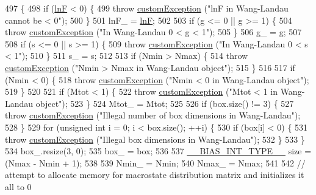 \begin{DoxyCode}
497                                                                                                            
                                     \{
498     \textcolor{keywordflow}{if} (\hyperlink{classwala_acb8e59580d97bc3c5b9b4ff45eb6bb9a}{lnF} < 0) \{
499         \textcolor{keywordflow}{throw} \hyperlink{classcustom_exception}{customException} (\textcolor{stringliteral}{"lnF in Wang-Landau cannot be < 0"});
500     \}
501     lnF\_ = \hyperlink{classwala_acb8e59580d97bc3c5b9b4ff45eb6bb9a}{lnF};
502 
503     \textcolor{keywordflow}{if} (g <= 0 || g >= 1) \{
504         \textcolor{keywordflow}{throw} \hyperlink{classcustom_exception}{customException} (\textcolor{stringliteral}{"In Wang-Landau 0 < g < 1"});
505     \}
506     g\_ = g;
507 
508     \textcolor{keywordflow}{if} (s <= 0 || s >= 1) \{
509         \textcolor{keywordflow}{throw} \hyperlink{classcustom_exception}{customException} (\textcolor{stringliteral}{"In Wang-Landau 0 < s < 1"});
510     \}
511     s\_ = s;
512 
513     \textcolor{keywordflow}{if} (Nmin > Nmax) \{
514         \textcolor{keywordflow}{throw} \hyperlink{classcustom_exception}{customException} (\textcolor{stringliteral}{"Nmin > Nmax in Wang-Landau object"});
515     \}
516 
517     \textcolor{keywordflow}{if} (Nmin < 0) \{
518         \textcolor{keywordflow}{throw} \hyperlink{classcustom_exception}{customException} (\textcolor{stringliteral}{"Nmin < 0 in Wang-Landau object"});
519     \}
520 
521     \textcolor{keywordflow}{if} (Mtot < 1) \{
522         \textcolor{keywordflow}{throw} \hyperlink{classcustom_exception}{customException} (\textcolor{stringliteral}{"Mtot < 1 in Wang-Landau object"});
523     \}
524     Mtot\_ = Mtot;
525 
526     \textcolor{keywordflow}{if} (box.size() != 3) \{
527         \textcolor{keywordflow}{throw} \hyperlink{classcustom_exception}{customException} (\textcolor{stringliteral}{"Illegal number of box dimensions in Wang-Landau"});
528     \}
529     \textcolor{keywordflow}{for} (\textcolor{keywordtype}{unsigned} \textcolor{keywordtype}{int} i = 0; i < box.size(); ++i) \{
530         \textcolor{keywordflow}{if} (box[i] < 0) \{
531             \textcolor{keywordflow}{throw} \hyperlink{classcustom_exception}{customException} (\textcolor{stringliteral}{"Illegal box dimensions in Wang-Landau"});
532         \}
533     \}
534     box\_.resize(3, 0);
535     box\_ = box;
536 
537     \hyperlink{bias_8h_a1ceb524363fcb94da0c64d297ea27438}{\_\_BIAS\_INT\_TYPE\_\_} size = (Nmax - Nmin + 1);
538 
539     Nmin\_ = Nmin;
540     Nmax\_ = Nmax;
541 
542     \textcolor{comment}{// attempt to allocate memory for macrostate distribution matrix and initializes it all to 0}

\end{DoxyCode}
